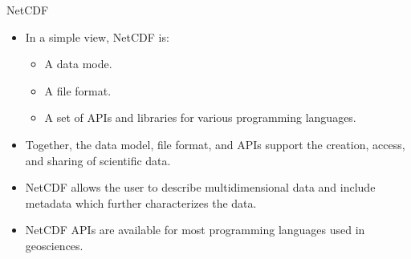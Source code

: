 \documentclass[compress,11pt,xcolor=svgnames,aspectratio=169]{beamer}
\begin{document}
\begin{frame}[t]{NetCDF}

\begin{itemize}
\setlength\itemsep{0.4cm}

\item In a simple view, NetCDF is:

    \begin{itemize}
        \item A data mode.
        \item A file format.
        \item A set of APIs and libraries for various programming languages.
    \end{itemize}

\item Together, the data model, file format, and APIs support the creation, access, and sharing of scientific data.

\item NetCDF allows the user to describe multidimensional data and include metadata which further characterizes the data.

\item NetCDF APIs are available for most programming languages used in geosciences.

\end{itemize}

\end{frame}
\end{document}
